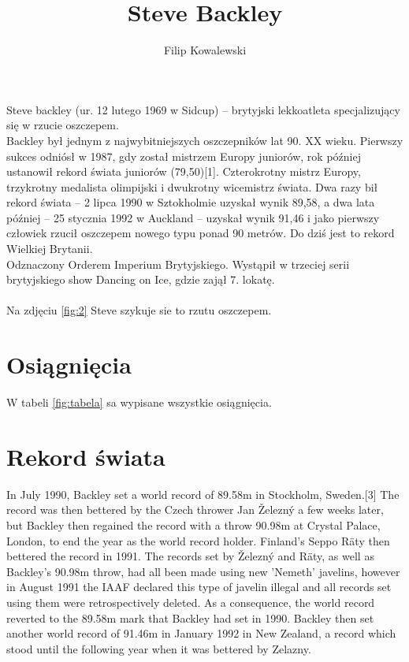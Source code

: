 \documentclass{article}
\begin{document}
\title{Steve Backley}
\author{Filip Kowalewski}
\date{}
\maketitle

Steve backley (ur. 12 lutego 1969 w Sidcup) – brytyjski lekkoatleta specjalizujący się w rzucie oszczepem.\\
Backley był jednym z najwybitniejszych oszczepników lat 90. XX wieku. Pierwszy sukces odniósł w 1987, gdy został mistrzem Europy juniorów, rok później ustanowił rekord świata juniorów (79,50)[1]. Czterokrotny mistrz Europy, trzykrotny medalista olimpijski i dwukrotny wicemistrz świata. Dwa razy bił rekord świata – 2 lipca 1990 w Sztokholmie uzyskał wynik 89,58, a dwa lata później – 25 stycznia 1992 w Auckland – uzyskał wynik 91,46 i jako pierwszy człowiek rzucił oszczepem nowego typu ponad 90 metrów. Do dziś jest to rekord Wielkiej Brytanii.\\
Odznaczony Orderem Imperium Brytyjskiego. Wystąpił w trzeciej serii brytyjskiego show Dancing on Ice, gdzie zajął 7. lokatę.\\
\\

Na zdjęciu \ref{fig:2} Steve szykuje sie to rzutu oszczepem.


\tableofcontents

\section{Osiągnięcia}

W tabeli \ref{fig:tabela} sa wypisane wszystkie osiągnięcia.




\section{Rekord świata}
In July 1990, Backley set a world record of 89.58m in Stockholm, Sweden.[3] The record was then bettered by the Czech thrower Jan Železný a few weeks later, but Backley then regained the record with a throw 90.98m at Crystal Palace, London, to end the year as the world record holder. Finland's Seppo Räty then bettered the record in 1991. The records set by Železný and Räty, as well as Backley's 90.98m throw, had all been made using new 'Nemeth' javelins, however in August 1991 the IAAF declared this type of javelin illegal and all records set using them were retrospectively deleted. As a consequence, the world record reverted to the 89.58m mark that Backley had set in 1990. Backley then set another world record of 91.46m in January 1992 in New Zealand, a record which stood until the following year when it was bettered by Zelazny.
\end{document}
